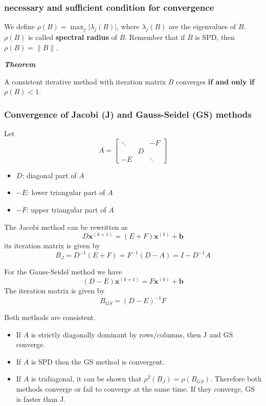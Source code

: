 \subsubsection{necessary and sufficient condition for convergence}

We define $\rho(B) = \max_{j} \lvert \lambda_{j}(B) \rvert$,
where $\lambda_{j}(B)$ are the eigenvalues of $B$.
$\rho(B)$ is called \textbf{spectral radius} of $B$.
Remember that if $B$ is SPD, then $\rho(B) = \lVert B \rVert$.

\textbf{\textit{Theorem}}

A consistent iterative method with iteration matrix $B$ converges \textbf{if and only if} $\rho(B) < 1$.

\subsubsection{Convergence of Jacobi (J) and Gauss-Seidel (GS) methods}

Let
$$
    A = \begin{bmatrix}
        \ddots &   & -F     \\
               & D &        \\
        -E     &   & \ddots
    \end{bmatrix}
$$

\begin{itemize}
    \item $D$: diagonal part of $A$
    \item $-E$: lower triangular part of $A$
    \item $-F$: upper triangular part of $A$
\end{itemize}

The Jacobi method can be rewritten as
$$
    D \mathbf{x}^{(k+1)} = (E+F)\mathbf{x}^{(k)} + \mathbf{b}
$$
its iteration matrix is given by
$$
    B_{J} = D^{-1}(E+F) = F^{-1}(D - A) = I - D^{-1}A
$$

For the Gauss-Seidel method we have
$$
    (D - E)\mathbf{x}^{(k+1)} = F \mathbf{x}^{(k)} + \mathbf{b}
$$
The iteration matrix is given by
$$
    B_{GS} = (D - E)^{-1}F
$$

Both methods are consistent.

\begin{itemize}
    \item If $A$ is strictly diagonally dominant by rows/columns, then J and GS converge.
    \item If $A$ is SPD then the GS method is convergent.
    \item If $A$ is tridiagonal, it can be shown that $\rho^{2}(B_{J}) = \rho(B_{GS})$. Therefore both methods converge or fail to converge at the same time. If they converge, GS is faster than J.
\end{itemize}


